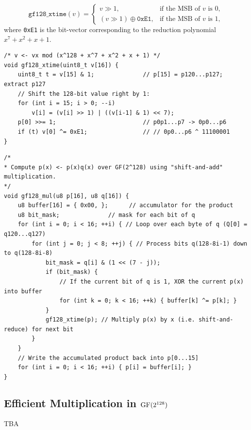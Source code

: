 \[
\mathtt{gf128\_xtime}(v) = 
\begin{cases}
	v \gg 1, &\text{if the MSB of }v\text{ is }0,\\[6pt]
	(v \gg 1)\oplus\texttt{0xE1}, &\text{if the MSB of }v\text{ is }1,
\end{cases}
\]
where \texttt{0xE1} is the bit-vector corresponding to the reduction polynomial
\(x^7+x^2+x+1\).
\vfill
\begin{lstlisting}[style=cstyle]
/* v <- vx mod (x^128 + x^7 + x^2 + x + 1) */
void gf128_xtime(uint8_t v[16]) {
	uint8_t t = v[15] & 1;				// p[15] = p120...p127; extract p127
	// Shift the 128-bit value right by 1:
	for (int i = 15; i > 0; --i)		
		v[i] = (v[i] >> 1) | ((v[i-1] & 1) << 7);
	p[0] >>= 1;							// p0p1...p7 -> 0p0...p6
	if (t) v[0] ^= 0xE1;                // // 0p0...p6 ^ 11100001
}
\end{lstlisting}

\begin{lstlisting}[style=cstyle]
/*
* Compute p(x) <- p(x)q(x) over GF(2^128) using "shift-and-add" multiplication.
*/
void gf128_mul(u8 p[16], u8 q[16]) {
	u8 buffer[16] = { 0x00, };      // accumulator for the product
	u8 bit_mask;              // mask for each bit of q
	for (int i = 0; i < 16; ++i) { // Loop over each byte of q (Q[0] = q120...q127)
		for (int j = 0; j < 8; ++j) { // Process bits q(128-8i-1) down to q(128-8i-8)
			bit_mask = q[i] & (1 << (7 - j));
			if (bit_mask) {
				// If the current bit of q is 1, XOR the current p(x) into buffer
				for (int k = 0; k < 16; ++k) { buffer[k] ^= p[k]; }
			}
			gf128_xtime(p); // Multiply p(x) by x (i.e. shift-and-reduce) for next bit
		}
	}
	// Write the accumulated product back into p[0...15]
	for (int i = 0; i < 16; ++i) { p[i] = buffer[i]; }
}
\end{lstlisting}
\newpage

\subsection{Efficient Multiplication in $\operatorname{GF}(2^{128})$}
TBA
\fi